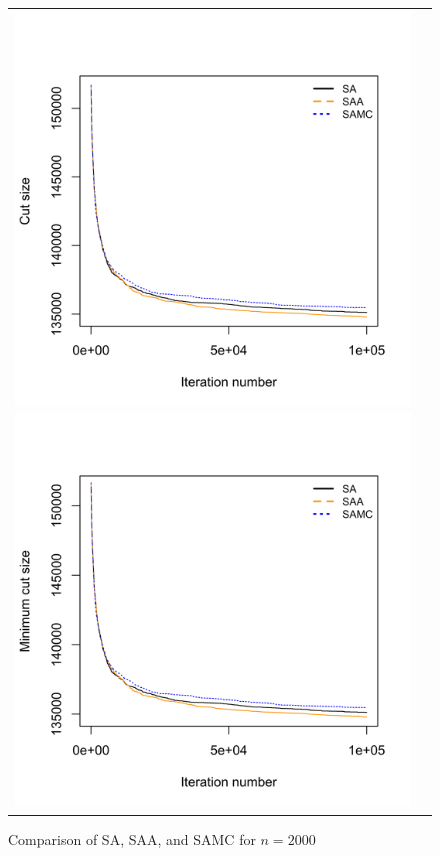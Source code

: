 \documentclass[11pt,]{article}
\begin{document}
\begin{figure}[hbpt]
  \begin{tabular}{cc}
    \includegraphics[width=.5\textwidth]{images/graph_cut_n2000_iter1e+05}
    \includegraphics[width=.5\textwidth]{images/graph_min_cut_n2000_iter1e+05}
  \end{tabular}
  \caption{Comparison of SA, SAA, and SAMC for $n = 2000$}
  \label{fig:n2000}
\end{figure}
\end{document}
